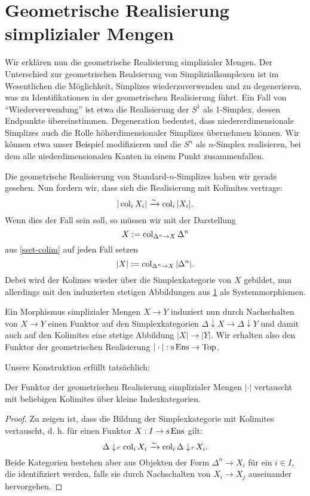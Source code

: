 \section{Geometrische Realisierung simplizialer Mengen}

Wir erklären nun die geometrische Realisierung simplizialer
Mengen. Der Unterschied zur geometrischen Realsierung von
Simplizialkomplexen ist im Wesentlichen die Möglichkeit, Simplizes
wiederzuverwenden und zu degenerieren, was zu Identifikationen in der
geometrischen Realisierung führt. Ein Fall von ``Wiederverwendung''
ist etwa die Realisierung der $S^1$ als 1-Simplex, dessen Endpunkte
übereinstimmen. Degeneration bedeutet, dass niedererdimensionale
Simplizes auch die Rolle höherdimensionaler Simplizes übernehmen
können. Wir können etwa unser Beispiel modifizieren und die $S^n$ als
$n$-Simplex realisieren, bei dem alle niederdimensionalen Kanten in
einem Punkt zusammenfallen.

Die geometrische Realisierung von Standard-$n$-Simplizes haben wir
gerade gesehen. Nun fordern wir, dass sich die Realisierung mit
Kolimites vertrage:
\begin{equation} \label{eq:real-cocont}
|\operatorname{col}_i X_i| \xrightarrow[]{\sim} \operatorname{col}_i |X_i|.
\end{equation}
Wenn dies der Fall sein soll, so müssen wir mit der Darstellung
\[ X := \operatorname{col}_{\Delta^n \to X} \Delta^n \]
aus \ref{sset-colim} auf jeden Fall setzen
\begin{equation} \label{eq:real-colim}
|X| := \operatorname{col}_{\Delta^n \to X} |\Delta^n|.
\end{equation}
Debei wird der Kolimes wieder über die Simplexkategorie von $X$
gebildet, nun allerdings mit den induzierten stetigen Abbildungen aus
\ref{} als Systemmorphismen.

Ein Morphismus simplizialer Mengen $X \to Y$ induziert nun durch
Nachschalten von $X \to Y$ einen Funktor auf den Simplexkategorien
$\Delta \downarrow X \to \Delta \downarrow Y$ und damit auch auf den
Kolimites eine stetige Abbildung $|X| \to |Y|$. Wir erhalten also den
Funktor der geometrischen Realisierung $| \cdot |: \operatorname{s} \operatorname{Ens} \to \operatorname{Top}$.

Unsere Konstruktion erfüllt tatsächlich:
\begin{prop}
  Der Funktor der geometrischen Realisierung simplizialer Mengen $|
  \cdot|$ vertauscht mit beliebigen Kolimites über kleine
  Indexkategorien.
\end{prop}
\begin{proof}
  Zu zeigen ist, dass die Bildung der Simplexkategorie mit Kolimites
  vertauscht, d. h. für einen Funktor $X: I \to \operatorname{s}\operatorname{Ens}$ gilt:
  \[ \Delta \downarrow \! {\scriptstyle r} \, \operatorname{col}_i X_i \xrightarrow[]{\sim} \operatorname{col}_i \Delta \downarrow \! {\scriptstyle r} \, X_i. \]
  Beide Kategorien bestehen aber aus Objekten der Form $\Delta^n \to
  X_i$ für ein $i \in I$, die identifiziert werden, falls sie durch
  Nachschalten von $X_i \to X_j$ auseinander hervorgehen.
\end{proof}

